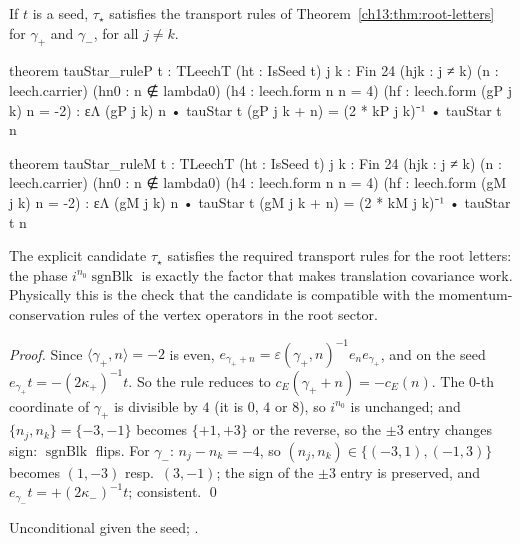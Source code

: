 \begin{theorem}\label{ch13:thm:rules}
If $t$ is a seed, $\tau_\star$ satisfies the transport rules of Theorem~\ref{ch13:thm:root-letters} for
$\gamma_+$ and $\gamma_-$, for all $j\neq k$.
\end{theorem}
\begin{leancode}
theorem tauStar_ruleP {t : TLeechT} (ht : IsSeed t) {j k : Fin 24} (hjk : j ≠ k) (n : leech.carrier)
    (hn0 : n ∉ lambda0) (h4 : leech.form n n = 4) (hf : leech.form (gP j k) n = -2) :
    εΛ (gP j k) n • tauStar t (gP j k + n) = (2 * kP j k)⁻¹ • tauStar t n

theorem tauStar_ruleM {t : TLeechT} (ht : IsSeed t) {j k : Fin 24} (hjk : j ≠ k) (n : leech.carrier)
    (hn0 : n ∉ lambda0) (h4 : leech.form n n = 4) (hf : leech.form (gM j k) n = -2) :
    εΛ (gM j k) n • tauStar t (gM j k + n) = (2 * kM j k)⁻¹ • tauStar t n
\end{leancode}
\begin{physics}
The explicit candidate $\tau_\star$ satisfies the required transport rules for the root letters: the phase $i^{n_0}\operatorname{sgnBlk}$ is exactly the factor that makes translation covariance work. Physically this is the check that the candidate is compatible with the momentum-conservation rules of the vertex operators in the root sector.
\end{physics}
\noindent\emph{Proof.} Since $\langle\gamma_+,n\rangle=-2$ is even, $e_{\gamma_++n}=\varepsilon(\gamma_+,n)^{-1}e_ne_{\gamma_+}$, and on the seed
$e_{\gamma_+}t=-(2\kappa_+)^{-1}t$. So the rule reduces to $c_E(\gamma_++n)=-c_E(n)$. The $0$-th coordinate of $\gamma_+$ is
divisible by $4$ (it is $0$, $4$ or $8$), so $i^{n_0}$ is unchanged; and $\{n_j,n_k\}=\{-3,-1\}$ becomes $\{+1,+3\}$ or
the reverse, so the $\pm3$ entry changes sign: $\operatorname{sgnBlk}$ flips. For $\gamma_-$: $n_j-n_k=-4$, so
$(n_j,n_k)\in\{(-3,1),(-1,3)\}$ becomes $(1,-3)$ resp.\ $(3,-1)$; the sign of the $\pm3$ entry is preserved,
and $e_{\gamma_-}t=+(2\kappa_-)^{-1}t$; consistent. \qed
\begin{status}Unconditional given the seed; .\end{status}

